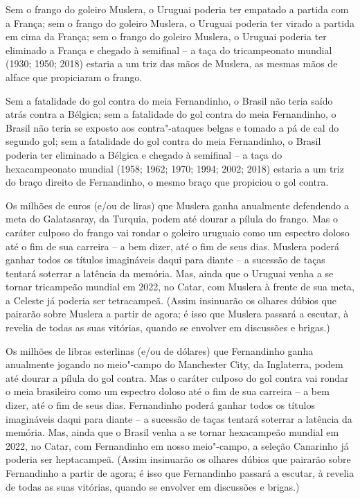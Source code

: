 Sem o frango do goleiro Muslera, o Uruguai poderia ter empatado a
partida com a França; sem o frango do goleiro Muslera, o Uruguai poderia
ter virado a partida em cima da França; sem o frango do goleiro Muslera,
o Uruguai poderia ter eliminado a França e chegado à semifinal -- a taça
do tricampeonato mundial (1930; 1950; 2018) estaria a um triz das mãos
de Muslera, as mesmas mãos de alface que propiciaram o frango.

Sem a fatalidade do gol contra do meia Fernandinho, o Brasil não teria
saído atrás contra a Bélgica; sem a fatalidade do gol contra do meia
Fernandinho, o Brasil não teria se exposto aos contra"-ataques belgas e
tomado a pá de cal do segundo gol; sem a fatalidade do gol contra do
meia Fernandinho, o Brasil poderia ter eliminado a Bélgica e chegado à
semifinal -- a taça do hexacampeonato mundial (1958; 1962; 1970; 1994;
2002; 2018) estaria a um triz do braço direito de Fernandinho, o mesmo
braço que propiciou o gol contra.

Os milhões de euros (e/ou de liras) que Muslera ganha anualmente
defendendo a meta do Galatasaray, da Turquia, podem até dourar a pílula
do frango. Mas o caráter culposo do frango vai rondar o goleiro uruguaio
como um espectro doloso até o fim de sua carreira -- a bem dizer, até o
fim de seus dias. Muslera poderá ganhar todos os títulos imagináveis
daqui para diante -- a sucessão de taças tentará soterrar a latência da
memória. Mas, ainda que o Uruguai venha a se tornar tricampeão mundial
em 2022, no Catar, com Muslera à frente de sua meta, a Celeste já
poderia ser tetracampeã. (Assim insinuarão os olhares dúbios que
pairarão sobre Muslera a partir de agora; é isso que Muslera passará a
escutar, à revelia de todas as suas vitórias, quando se envolver em
discussões e brigas.)

Os milhões de libras esterlinas (e/ou de dólares) que Fernandinho ganha
anualmente jogando no meio"-campo do Manchester City, da Inglaterra,
podem até dourar a pílula do gol contra. Mas o caráter culposo do gol
contra vai rondar o meia brasileiro como um espectro doloso até o fim de
sua carreira -- a bem dizer, até o fim de seus dias. Fernandinho poderá
ganhar todos os títulos imagináveis daqui para diante -- a sucessão de
taças tentará soterrar a latência da memória. Mas, ainda que o Brasil
venha a se tornar hexacampeão mundial em 2022, no Catar, com Fernandinho
em nosso meio"-campo, a seleção Canarinho já poderia ser heptacampeã.
(Assim insinuarão os olhares dúbios que pairarão sobre Fernandinho a
partir de agora; é isso que Fernandinho passará a escutar, à revelia de
todas as suas vitórias, quando se envolver em discussões e brigas.)

